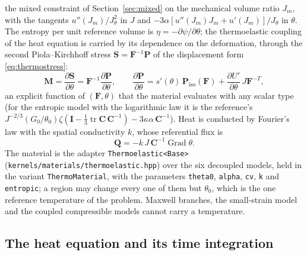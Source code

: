 \documentclass[11pt]{article}
\newcommand{\Grad}{\operatorname{Grad}}
\newcommand{\tr}{\operatorname{tr}}
\newcommand{\bP}{\bm{P}}
\newcommand{\bS}{\bm{S}}
\newcommand{\bF}{\bm{F}}
\newcommand{\bC}{\bm{C}}
\newcommand{\bI}{\bm{I}}
\newcommand{\bQ}{\bm{Q}}
\newcommand{\bM}{\bm{M}}
\DeclareRobustCommand{\code}[1]{{\def\_{\textunderscore\allowbreak}\texttt{#1}}}
\DeclareRobustCommand{\file}[1]{{\def\_{\textunderscore\allowbreak}\texttt{#1}}}
\begin{document}
the mixed constraint of Section~\ref{sec:mixed} on the mechanical volume
ratio $J_m$, with the tangents $u''(J_m)/J_\theta^2$ in $J$ and
$-3\alpha[u''(J_m)J_m + u'(J_m)]/J_\theta$ in $\theta$.  The entropy per
unit reference volume is $\eta = -\partial\psi/\partial\theta$; the
thermoelastic coupling of the heat equation is carried by its dependence on
the deformation, through the second Piola--Kirchhoff stress
$\bS = \bF^{-1}\bP$ of the displacement form \eqref{eq:thermostress}:
\begin{equation}
  \bM = \frac{\partial\bS}{\partial\theta} = \bF^{-1}\frac{\partial\bP}{\partial\theta},
  \qquad
  \frac{\partial\bP}{\partial\theta} = s'(\theta)\,\bP_{\mathrm{iso}}(\bF) + \frac{\partial U'}{\partial\theta}\,J\bF^{-T},
  \label{eq:thermoM}
\end{equation}
an explicit function of $(\bF, \theta)$ that the material evaluates with
any scalar type (for the entropic model with the logarithmic law it is the
reference's $J^{-2/3}(G_0/\theta_0)\zeta(\bI - \tfrac13\tr\bC\,\bC^{-1}) - 3\kappa\alpha\,\bC^{-1}$).
Heat is conducted by Fourier's law with the spatial conductivity $k$, whose
referential flux is
\begin{equation}
  \bQ = -k\,J\,\bC^{-1}\Grad\theta .
  \label{eq:fourier}
\end{equation}
The material is the adapter \code{Thermoelastic<Base>}
(\file{kernels/materials/thermoelastic.hpp}) over the six decoupled models,
held in the variant \code{ThermoMaterial}, with the parameters
\code{theta0}, \code{alpha}, \code{c\_v}, \code{k} and \code{entropic}; a
region may change every one of them but $\theta_0$, which is the one
reference temperature of the problem.  Maxwell branches, the small-strain
model and the coupled compressible models cannot carry a temperature.

\subsection{The heat equation and its time integration}
\end{document}
